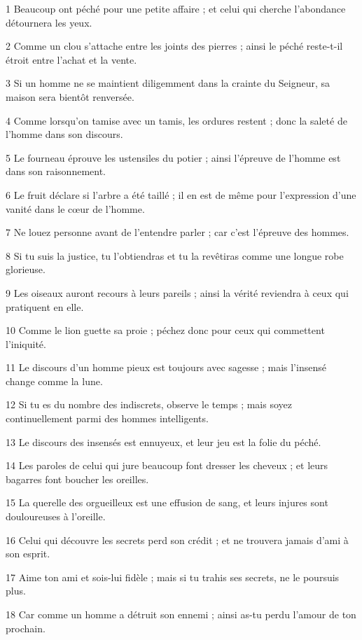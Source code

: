 \par 1 Beaucoup ont péché pour une petite affaire ; et celui qui cherche l'abondance détournera les yeux.
\par 2 Comme un clou s'attache entre les joints des pierres ; ainsi le péché reste-t-il étroit entre l’achat et la vente.
\par 3 Si un homme ne se maintient diligemment dans la crainte du Seigneur, sa maison sera bientôt renversée.
\par 4 Comme lorsqu'on tamise avec un tamis, les ordures restent ; donc la saleté de l'homme dans son discours.
\par 5 Le fourneau éprouve les ustensiles du potier ; ainsi l'épreuve de l'homme est dans son raisonnement.
\par 6 Le fruit déclare si l'arbre a été taillé ; il en est de même pour l’expression d’une vanité dans le cœur de l’homme.
\par 7 Ne louez personne avant de l'entendre parler ; car c'est l'épreuve des hommes.
\par 8 Si tu suis la justice, tu l'obtiendras et tu la revêtiras comme une longue robe glorieuse.
\par 9 Les oiseaux auront recours à leurs pareils ; ainsi la vérité reviendra à ceux qui pratiquent en elle.
\par 10 Comme le lion guette sa proie ; péchez donc pour ceux qui commettent l'iniquité.
\par 11 Le discours d'un homme pieux est toujours avec sagesse ; mais l'insensé change comme la lune.
\par 12 Si tu es du nombre des indiscrets, observe le temps ; mais soyez continuellement parmi des hommes intelligents.
\par 13 Le discours des insensés est ennuyeux, et leur jeu est la folie du péché.
\par 14 Les paroles de celui qui jure beaucoup font dresser les cheveux ; et leurs bagarres font boucher les oreilles.
\par 15 La querelle des orgueilleux est une effusion de sang, et leurs injures sont douloureuses à l'oreille.
\par 16 Celui qui découvre les secrets perd son crédit ; et ne trouvera jamais d'ami à son esprit.
\par 17 Aime ton ami et sois-lui fidèle ; mais si tu trahis ses secrets, ne le poursuis plus.
\par 18 Car comme un homme a détruit son ennemi ; ainsi as-tu perdu l'amour de ton prochain.
